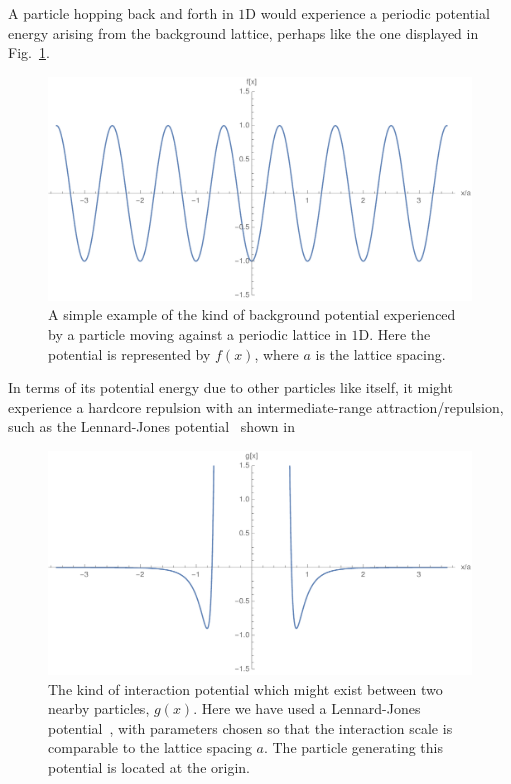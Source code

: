 A particle hopping back and forth in $1$D would experience a periodic potential energy arising from the 
background lattice, perhaps like the one displayed in Fig.~\ref{fig:periodicPot}.
\begin{figure} \caption[An impression of the kind of background potential experienced by a particle moving
against a periodic lattice in $1$D.]{A simple example of the kind of background potential experienced by a 
particle moving against a periodic lattice in $1$D. Here the potential is represented by $f(x)$, where $a$
is the lattice spacing.} 
\label{fig:periodicPot}
\begin{center}
\includegraphics[width=1.0\textwidth]{intro/images/fPlot}
\end{center}
\end{figure}
In terms of its potential
energy due to other particles like itself, it might experience a hardcore repulsion with an 
intermediate-range attraction/repulsion, such as the Lennard-Jones 
potential~\cite{atkins2011} shown in 
\begin{figure} \caption[The kind of interaction potential which might exist between two nearby particles.]{The kind of interaction potential which might exist between two nearby particles, $g(x)$. Here we have 
used a Lennard-Jones potential~\cite{atkins2011}, with parameters chosen so that the interaction scale is comparable to the
lattice spacing $a$. The particle generating this potential is located at the origin.} 
\label{fig:partInteraction}
\begin{center}
\includegraphics[width=1.0\textwidth]{intro/images/gPlot}
\end{center}
\end{figure}

